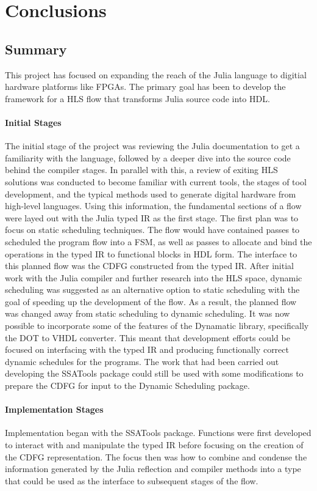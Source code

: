\chapter{Conclusions}

\section{Summary}
This project has focused on expanding the reach of the Julia language to digitial hardware platforms like FPGAs. The primary goal has been to develop the framework for a HLS flow that transforms Julia source code into HDL. 

\subsubsection{Initial Stages}
The initial stage of the project was reviewing the Julia documentation to get a familiarity with the language, followed by a deeper dive into the source code behind the compiler stages. In parallel with this, a review of exiting HLS solutions was conducted to become familiar with current tools, the stages of tool development, and the typical methods used to generate digital hardware from high-level languages. Using this information, the fundamental sections of a flow were layed out with the Julia typed IR as the first stage. The first plan was to focus on static scheduling techniques. The flow would have contained passes to scheduled the program flow into a FSM, as well as passes to allocate and bind the operations in the typed IR to functional blocks in HDL form. The interface to this planned flow was the CDFG constructed from the typed IR. After initial work with the Julia compiler and further research into the HLS space, dynamic scheduling was suggested as an alternative option to static scheduling with the goal of speeding up the development of the flow. As a result, the planned flow was changed away from static scheduling to dynamic scheduling. It was now possible to incorporate some of the features of the Dynamatic library, specifically the DOT to VHDL converter. This meant that development efforts could be focused on interfacing with the typed IR and producing functionally correct dynamic schedules for the programs. The work that had been carried out developing the SSATools package could still be used with some modifications to prepare the CDFG for input to the Dynamic Scheduling package.

\subsubsection{Implementation Stages}
Implementation began with the SSATools package. Functions were first developed to interact with and manipulate the typed IR before focusing on the creation of the CDFG representation. The focus then was how to combine and condense the information generated by the Julia reflection and compiler methods into a type that could be used as the interface to subsequent stages of the flow. 


